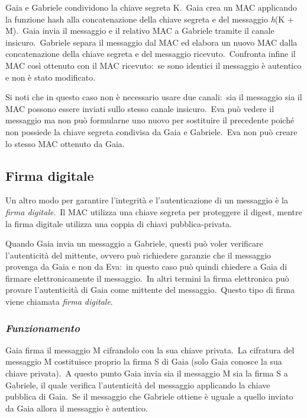 Gaia e Gabriele condividono la chiave segreta K.\
Gaia crea un MAC applicando la funzione hash alla concatenazione della chiave segreta e del messaggio \textit{h}(K + M).\
Gaia invia il messaggio e il relativo MAC a Gabriele tramite il canale insicuro.\
Gabriele separa il messaggio dal MAC ed elabora un nuovo MAC dalla concatenazione della chiave segreta e del messaggio ricevuto.\
Confronta infine il MAC così ottenuto con il MAC ricevuto:\ se sono identici il messaggio è autentico e non è stato modificato.

Si noti che in questo caso non è necessario usare due canali:\ sia il messaggio sia il MAC possono essere inviati sullo stesso canale insicuro.\
Eva può vedere il messaggio ma non può formularne uno nuovo per sostituire il precedente poiché non possiede la chiave segreta condivisa da Gaia e Gabriele.\
Eva non può creare lo stesso MAC ottenuto da Gaia.

\subsection{Firma digitale}

Un altro modo per garantire l'integrità e l'autenticazione di un messaggio è la \textit{firma digitale}.\
Il MAC utilizza una chiave segreta per proteggere il digest, mentre la firma digitale utilizza una coppia di chiavi pubblica-privata.

Quando Gaia invia un messaggio a Gabriele, questi può voler verificare l'autenticità del mittente, ovvero può richiedere garanzie che il messaggio provenga da Gaia e non da Eva:\ in questo caso può quindi chiedere a Gaia di firmare elettronicamente il messaggio.\
In altri termini la firma elettronica può provare l'autenticità di Gaia come mittente del messaggio.\
Questo tipo di firma viene chiamata \textit{firma digitale}.

\subsubsection{\textit{Funzionamento}}

Gaia firma il messaggio M cifrandolo con la sua chiave privata.\
La cifratura del messaggio M costituisce proprio la firma S di Gaia (solo Gaia conosce la sua chiave privata).\
A questo punto Gaia invia sia il messaggio M sia la firma S a Gabriele, il quale verifica l'autenticità del messaggio applicando la chiave pubblica di Gaia.\
Se il messaggio che Gabriele ottiene è uguale a quello inviato da Gaia allora il messaggio è autentico.


